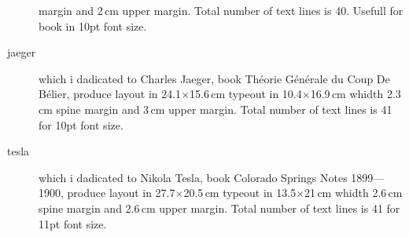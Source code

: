 \documentclass[a4paper,12pt]{article}
\begin{document}
\begin{description}
margin and 2\,cm upper margin. Total number of text lines is 40. Usefull for book in 10pt 
font size.
\item[jaeger] which i dadicated to Charles Jaeger, book Th\'{e}orie G\'{e}n\'{e}rale du Coup
De B\'{e}lier, produce layout in 24.1$\times$15.6\,cm typeout in 10.4$\times$16.9\,cm 
whidth 2.3\,cm spine margin and 3\,cm upper margin. Total number of text lines is 41 for 10pt 
font size.
\item[tesla] which i dadicated to Nikola Tesla, book Colorado Springs Notes 1899---1900, 
produce layout in 27.7$\times$20.5\,cm typeout in 13.5$\times$21\,cm whidth 2.6\,cm spine 
margin and 2.6\,cm upper margin. Total number of text lines is 41 for 11pt font size.
\end{description}
\end{document}
